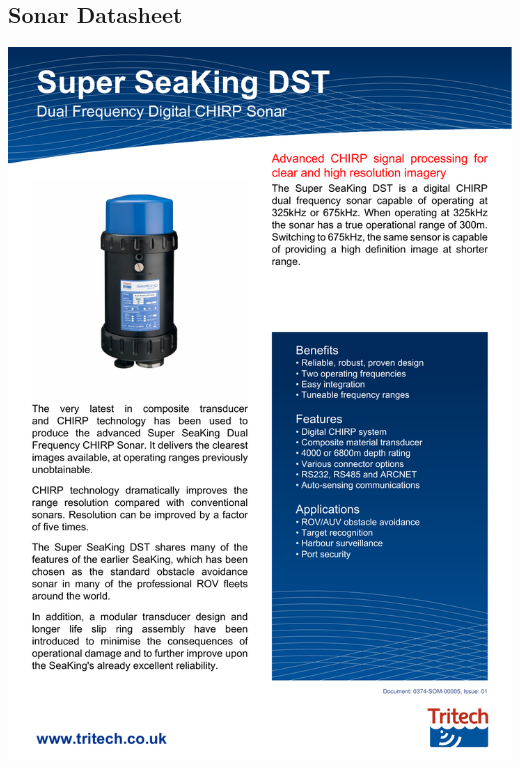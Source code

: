 \begin{appendices}
\subsection{Sonar Datasheet}
\includegraphics[width=1\columnwidth, page=2]{figs/datasheets/sonar.pdf}

\end{appendices}
